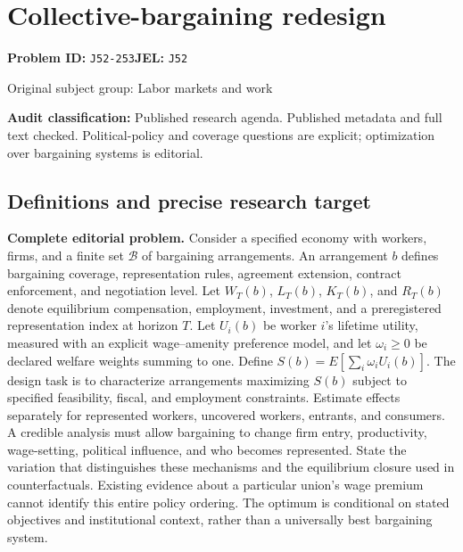\documentclass[11pt,a4paper]{article}
\begin{document}
\section*{Collective-bargaining redesign}
\textbf{Problem ID:} \texttt{J52-253}\quad \textbf{JEL:} \texttt{J52}\par
\label{problem:OP-0354}
{\sffamily\small\color{muted}Original subject group: Labor markets and work\par}
\label{definitions:problem:30007636}
\textbf{Audit classification:} Published research agenda. Published metadata and full text checked. Political-policy and coverage questions are explicit; optimization over bargaining systems is editorial.
\subsection*{Definitions and precise research target}
\textbf{Complete editorial problem.} Consider a specified economy with workers, firms, and a finite set \(\mathcal B\) of bargaining arrangements. An arrangement \(b\) defines bargaining coverage, representation rules, agreement extension, contract enforcement, and negotiation level. Let \(W_T(b)\), \(L_T(b)\), \(K_T(b)\), and \(R_T(b)\) denote equilibrium compensation, employment, investment, and a preregistered representation index at horizon \(T\). Let \(U_i(b)\) be worker \(i\)'s lifetime utility, measured with an explicit wage--amenity preference model, and let \(\omega_i\ge0\) be declared welfare weights summing to one. Define \(S(b)=E[\sum_i\omega_iU_i(b)]\). The design task is to characterize arrangements maximizing \(S(b)\) subject to specified feasibility, fiscal, and employment constraints. Estimate effects separately for represented workers, uncovered workers, entrants, and consumers. A credible analysis must allow bargaining to change firm entry, productivity, wage-setting, political influence, and who becomes represented. State the variation that distinguishes these mechanisms and the equilibrium closure used in counterfactuals. Existing evidence about a particular union's wage premium cannot identify this entire policy ordering. The optimum is conditional on stated objectives and institutional context, rather than a universally best bargaining system.
\end{document}
